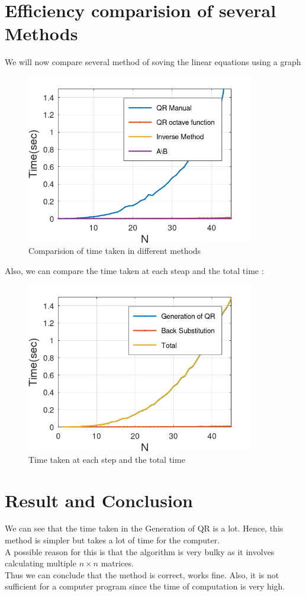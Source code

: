 \documentclass[12pt]{article}
\begin{document}
\section{Efficiency comparision of several Methods}
We will now compare several method of soving the linear equations using a graph
\begin{figure}[H]
    \centering
    \includegraphics[width=10cm]{n_time.png}
    \caption{Comparision of time taken in different methods}
\end{figure}
\newpage
Also, we can compare the time taken at each steap and the total time :
\begin{figure}[H]
    \centering
    \includegraphics[width=10cm]{manual_time.png}
    \caption{Time taken at each step and the total time}
\end{figure}

\section{Result and Conclusion}
We can see that the time taken in the Generation of QR is a lot. Hence,  this method is simpler but takes a lot of time for the computer.\\
A possible reason for this is that the algorithm is very bulky as it involves calculating multiple $n\times n$ matrices.\\
Thus we can conclude that the method is correct, works fine. Also, it is not sufficient for a computer program since the time of computation is very high.
\end{document}
